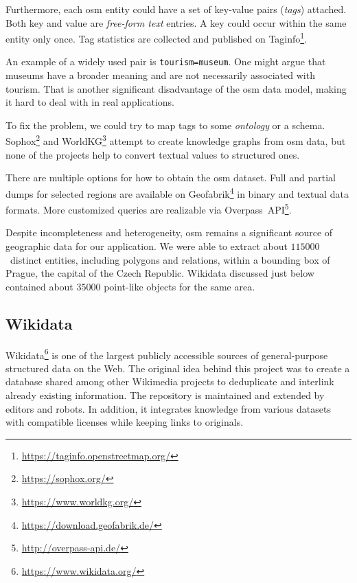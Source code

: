 Furthermore, each \acs{osm} entity could have a set of key-value pairs (\emph{tags}) attached. Both key and value are \emph{free-form text} entries. A key could occur within the same entity only once. Tag statistics are collected and published on Taginfo\footnote{\href{https://taginfo.openstreetmap.org/}{https://taginfo.openstreetmap.org/}}.

An example of a widely used pair is \texttt{tourism=museum}. One might argue that museums have a broader meaning and are not necessarily associated with tourism. That is another significant disadvantage of the \acs{osm} data model, making it hard to deal with in real applications.

To fix the problem, we could try to map tags to some \emph{ontology} or a schema. Sophox\footnote{\href{https://sophox.org/}{https://sophox.org/}} and WorldKG\footnote{\href{https://www.worldkg.org/}{https://www.worldkg.org/}} attempt to create knowledge graphs from \acs{osm} data, but none of the projects help to convert textual values to structured ones.

There are multiple options for how to obtain the \acs{osm} dataset. Full and partial dumps for selected regions are available on Geofabrik\footnote{\href{https://download.geofabrik.de/}{https://download.geofabrik.de/}} in binary and textual data formats. More customized queries are realizable via Overpass~API\footnote{\href{http://overpass-api.de/}{http://overpass-api.de/}}.

Despite incompleteness and heterogeneity, \acs{osm} remains a significant source of geographic data for our application. We were able to extract about $115000$~dis\-tinct entities, including polygons and relations, within a bounding box of Prague, the capital of the Czech Republic. Wikidata discussed just below contained about $35000$ point-like objects for the same area.

\subsection{Wikidata}\label{ssec:wikidata}

Wikidata\footnote{\href{https://www.wikidata.org/}{https://www.wikidata.org/}} is one of the largest publicly accessible sources of general-purpose structured data on the Web. The original idea behind this project was to create a database shared among other Wikimedia projects to deduplicate and interlink already existing information. The repository is maintained and extended by editors and robots. In addition, it integrates knowledge from various datasets with compatible licenses while keeping links to originals.

